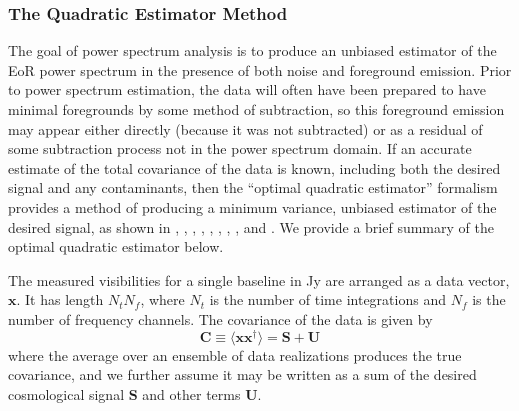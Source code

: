 \documentclass[preprint2,numberedappendix,tighten]{aastex6}  %
\begin{document}
\subsubsection{The Quadratic Estimator Method}
\label{sec:QE}


The goal of power spectrum analysis is to produce an unbiased estimator of the EoR power spectrum in the presence of both noise and foreground emission. Prior to power spectrum estimation, the data will often have been prepared to have minimal foregrounds by some method of subtraction, so this foreground emission may appear either directly (because it was not subtracted) or as a residual of some subtraction process not in the power spectrum domain. If an accurate estimate of the total covariance of the data is known, including both the desired signal and any contaminants, then the ``optimal quadratic estimator'' formalism provides a method of producing a minimum variance, unbiased estimator of the desired signal, as shown in 
\citet{liu_tegmark2011}, \citet{dillon_et_al2013a}, \citet{liu_et_al2014a}, \citet{liu_et_al2014b}, \citet{trott_et_al2012}, \citet{dillon_et_al2014}, \citet{dillon_et_al2015}, \citet{switzer_et_al2015}, and \citet{trott_et_al2016}. 
We provide a brief summary of the optimal quadratic estimator below.

The measured visibilities for a single baseline in Jy are arranged as a data vector, $\textbf{x}$. It has length $N_{t} N_{f}$,
where $N_{t}$ is the number of time integrations and $N_{f}$ is the number of frequency channels. The covariance of the data is given by 
\begin{equation}
\textbf{C} \equiv \langle\textbf{xx}^{\dagger}\rangle = \textbf{S} + \textbf{U}
\end{equation}
where the average over an ensemble of data realizations produces the true covariance, and we further assume it may be written as a sum of the desired cosmological signal $\textbf{S}$ and other terms $\textbf{U}$.  
\end{document}
